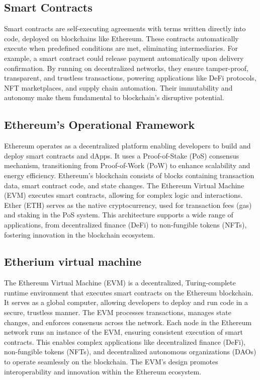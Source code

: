\documentclass[12pt, a4paper]{article}
\begin{document}
\subsection{Smart Contracts}
Smart contracts are self-executing agreements with terms written directly into code, deployed on blockchains like Ethereum. These contracts automatically execute when predefined conditions are met, eliminating intermediaries. For example, a smart contract could release payment automatically upon delivery confirmation. By running on decentralized networks, they ensure tamper-proof, transparent, and trustless transactions, powering applications like DeFi protocols, NFT marketplaces, and supply chain automation. Their immutability and autonomy make them fundamental to blockchain's disruptive potential.
\subsection{Ethereum's Operational Framework}
Ethereum operates as a decentralized platform enabling developers to build and deploy smart contracts and dApps. It uses a Proof-of-Stake (PoS) consensus mechanism, transitioning from Proof-of-Work (PoW) to enhance scalability and energy efficiency. Ethereum's blockchain consists of blocks containing transaction data, smart contract code, and state changes. The Ethereum Virtual Machine (EVM) executes smart contracts, allowing for complex logic and interactions. Ether (ETH) serves as the native cryptocurrency, used for transaction fees (gas) and staking in the PoS system. This architecture supports a wide range of applications, from decentralized finance (DeFi) to non-fungible tokens (NFTs), fostering innovation in the blockchain ecosystem.
\subsection{Etherium virtual machine}
The Ethereum Virtual Machine (EVM) is a decentralized, Turing-complete runtime environment that executes smart contracts on the Ethereum blockchain. It serves as a global computer, allowing developers to deploy and run code in a secure, trustless manner. The EVM processes transactions, manages state changes, and enforces consensus across the network. Each node in the Ethereum network runs an instance of the EVM, ensuring consistent execution of smart contracts. This enables complex applications like decentralized finance (DeFi), non-fungible tokens (NFTs), and decentralized autonomous organizations (DAOs) to operate seamlessly on the blockchain. The EVM's design promotes interoperability and innovation within the Ethereum ecosystem.
\end{document}
